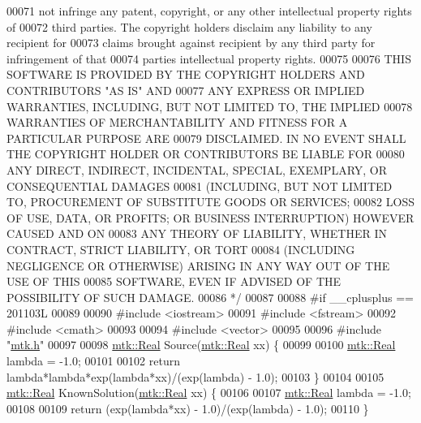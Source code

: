 \begin{DoxyCode}
00071 \textcolor{comment}{not infringe any patent, copyright, or any other intellectual property rights of}
00072 \textcolor{comment}{third parties. The copyright holders disclaim any liability to any recipient for}
00073 \textcolor{comment}{claims brought against recipient by any third party for infringement of that}
00074 \textcolor{comment}{parties intellectual property rights.}
00075 \textcolor{comment}{}
00076 \textcolor{comment}{THIS SOFTWARE IS PROVIDED BY THE COPYRIGHT HOLDERS AND CONTRIBUTORS "AS IS" AND}
00077 \textcolor{comment}{ANY EXPRESS OR IMPLIED WARRANTIES, INCLUDING, BUT NOT LIMITED TO, THE IMPLIED}
00078 \textcolor{comment}{WARRANTIES OF MERCHANTABILITY AND FITNESS FOR A PARTICULAR PURPOSE ARE}
00079 \textcolor{comment}{DISCLAIMED. IN NO EVENT SHALL THE COPYRIGHT HOLDER OR CONTRIBUTORS BE LIABLE FOR}
00080 \textcolor{comment}{ANY DIRECT, INDIRECT, INCIDENTAL, SPECIAL, EXEMPLARY, OR CONSEQUENTIAL DAMAGES}
00081 \textcolor{comment}{(INCLUDING, BUT NOT LIMITED TO, PROCUREMENT OF SUBSTITUTE GOODS OR SERVICES;}
00082 \textcolor{comment}{LOSS OF USE, DATA, OR PROFITS; OR BUSINESS INTERRUPTION) HOWEVER CAUSED AND ON}
00083 \textcolor{comment}{ANY THEORY OF LIABILITY, WHETHER IN CONTRACT, STRICT LIABILITY, OR TORT}
00084 \textcolor{comment}{(INCLUDING NEGLIGENCE OR OTHERWISE) ARISING IN ANY WAY OUT OF THE USE OF THIS}
00085 \textcolor{comment}{SOFTWARE, EVEN IF ADVISED OF THE POSSIBILITY OF SUCH DAMAGE.}
00086 \textcolor{comment}{*/}
00087 
00088 \textcolor{preprocessor}{#if \_\_cplusplus == 201103L}
00089 
00090 \textcolor{preprocessor}{#include <iostream>}
00091 \textcolor{preprocessor}{#include <fstream>}
00092 \textcolor{preprocessor}{#include <cmath>}
00093 
00094 \textcolor{preprocessor}{#include <vector>}
00095 
00096 \textcolor{preprocessor}{#include "\hyperlink{mtk_8h}{mtk.h}"}
00097 
00098 \hyperlink{group__c01-roots_gac080bbbf5cbb5502c9f00405f894857d}{mtk::Real} Source(\hyperlink{group__c01-roots_gac080bbbf5cbb5502c9f00405f894857d}{mtk::Real} xx) \{
00099 
00100   \hyperlink{group__c01-roots_gac080bbbf5cbb5502c9f00405f894857d}{mtk::Real} lambda = -1.0;
00101 
00102   \textcolor{keywordflow}{return} lambda*lambda*exp(lambda*xx)/(exp(lambda) - 1.0);
00103 \}
00104 
00105 \hyperlink{group__c01-roots_gac080bbbf5cbb5502c9f00405f894857d}{mtk::Real} KnownSolution(\hyperlink{group__c01-roots_gac080bbbf5cbb5502c9f00405f894857d}{mtk::Real} xx) \{
00106 
00107   \hyperlink{group__c01-roots_gac080bbbf5cbb5502c9f00405f894857d}{mtk::Real} lambda = -1.0;
00108 
00109   \textcolor{keywordflow}{return} (exp(lambda*xx) - 1.0)/(exp(lambda) - 1.0);
00110 \}

\end{DoxyCode}
